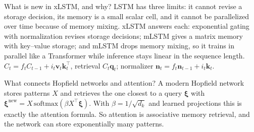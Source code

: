 
\begin{qabox}[Hochreiter]{\cexam What is new in xLSTM, and why?}
\ans LSTM has three limits: it cannot revise a storage decision, its memory is a small scalar
cell, and it cannot be parallelized over time because of memory mixing. xLSTM answers each:
exponential gating with normalization revises storage decisions; mLSTM gives a matrix memory
with key--value storage; and mLSTM drops memory mixing, so it trains in parallel like a
Transformer while inference stays linear in the sequence length.
\formula $C_t=f_tC_{t-1}+i_t\mathbf{v}_t\mathbf{k}_t^\top$, retrieval $C_t\mathbf{q}_t$; normalizer
$\mathbf{n}_t=f_t\mathbf{n}_{t-1}+i_t\mathbf{k}_t$.
\end{qabox}

\begin{qabox}[Hochreiter]{\pred What connects Hopfield networks and attention?}
\ans A modern Hopfield network stores patterns $X$ and retrieves the one closest to a query
$\bm\xi$ with $\bm\xi^{\text{new}}=X\,\mathrm{softmax}(\beta X^\top\bm\xi)$. With $\beta=1/\sqrt{d_k}$
and learned projections this is exactly the attention formula. So attention is associative
memory retrieval, and the network can store exponentially many patterns.
\end{qabox}
